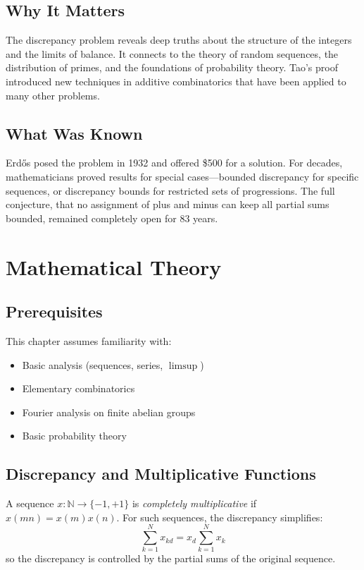 \subsection{Why It Matters}
The discrepancy problem reveals deep truths about the structure of the integers and the limits of balance. It connects to the theory of random sequences, the distribution of primes, and the foundations of probability theory. Tao's proof introduced new techniques in additive combinatorics that have been applied to many other problems.

\subsection{What Was Known}
Erd\H{o}s posed the problem in 1932 and offered \$500 for a solution. For decades, mathematicians proved results for special cases---bounded discrepancy for specific sequences, or discrepancy bounds for restricted sets of progressions. The full conjecture, that no assignment of plus and minus can keep all partial sums bounded, remained completely open for 83 years.

\section{Mathematical Theory}


\subsection{Prerequisites}
This chapter assumes familiarity with:
\begin{itemize}
\item Basic analysis (sequences, series, $\limsup$)
\item Elementary combinatorics
\item Fourier analysis on finite abelian groups
\item Basic probability theory
\end{itemize}

\subsection{Discrepancy and Multiplicative Functions}
A sequence $x: \mathbb{N} \to \{-1, +1\}$ is \emph{completely multiplicative} if $x(mn) = x(m)x(n)$. For such sequences, the discrepancy simplifies:
\[
\sum_{k=1}^N x_{kd} = x_d \sum_{k=1}^N x_k
\]
so the discrepancy is controlled by the partial sums of the original sequence.

